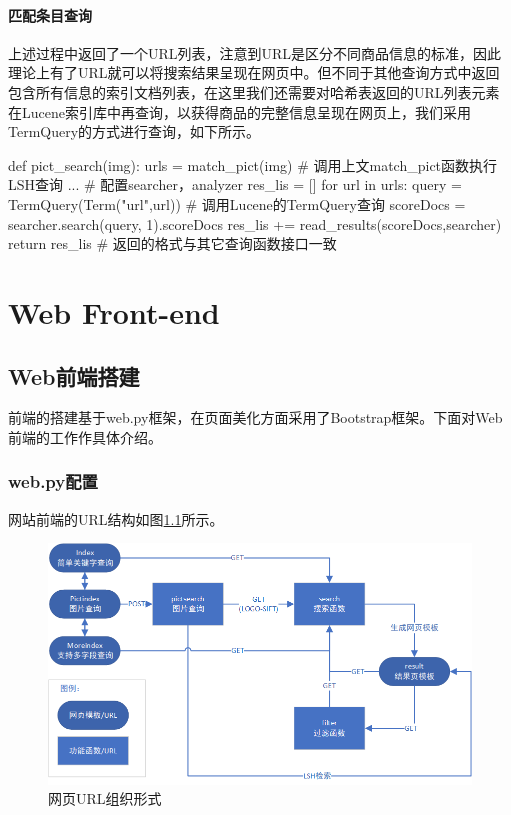 \subsection{匹配条目查询}

上述过程中返回了一个URL列表，注意到URL是区分不同商品信息的标准，因此理论上有了URL就可以将搜索结果呈现在网页中。但不同于其他查询方式中返回包含所有信息的索引文档列表，在这里我们还需要对哈希表返回的URL列表元素在Lucene索引库中再查询，以获得商品的完整信息呈现在网页上，我们采用TermQuery的方式进行查询，如下所示。

\begin{python}
def pict_search(img):
    urls = match_pict(img)             # 调用上文match_pict函数执行LSH查询
    ... # 配置searcher，analyzer
    res_lis = []
    for url in urls:
        query = TermQuery(Term("url",url))   # 调用Lucene的TermQuery查询
        scoreDocs = searcher.search(query, 1).scoreDocs
        res_lis += read_results(scoreDocs,searcher)
    return res_lis                     # 返回的格式与其它查询函数接口一致
\end{python}


\part{Web Front-end}

\chapter{Web前端搭建}

前端的搭建基于web.py框架，在页面美化方面采用了Bootstrap框架。下面对Web前端的工作作具体介绍。

\section{web.py配置}

网站前端的URL结构如图\ref{fig:zlt_url}所示。

\begin{figure}[htbp]
\centering
\includegraphics[width=13.5cm]{img/zlt/url.png}
\caption{网页URL组织形式}
\label{fig:zlt_url}
\end{figure}

